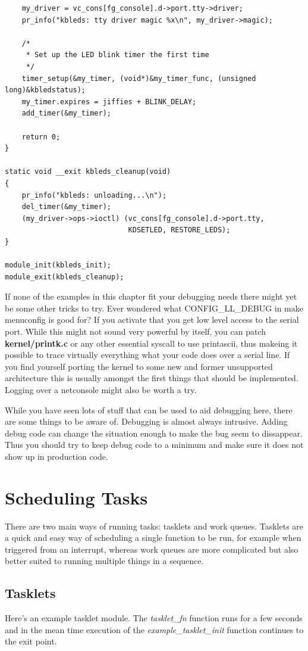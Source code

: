 \documentclass[11pt]{article}
\begin{document}
\begin{verbatim}
    my_driver = vc_cons[fg_console].d->port.tty->driver;
    pr_info("kbleds: tty driver magic %x\n", my_driver->magic);

    /*
     * Set up the LED blink timer the first time
     */
    timer_setup(&my_timer, (void*)&my_timer_func, (unsigned long)&kbledstatus);
    my_timer.expires = jiffies + BLINK_DELAY;
    add_timer(&my_timer);

    return 0;
}

static void __exit kbleds_cleanup(void)
{
    pr_info("kbleds: unloading...\n");
    del_timer(&my_timer);
    (my_driver->ops->ioctl) (vc_cons[fg_console].d->port.tty,
                             KDSETLED, RESTORE_LEDS);
}

module_init(kbleds_init);
module_exit(kbleds_cleanup);
\end{verbatim}

If none of the examples in this chapter fit your debugging needs there might yet be some other tricks to try. Ever wondered what CONFIG\_LL\_DEBUG in make menuconfig is good for? If you activate that you get low level access to the serial port. While this might not sound very powerful by itself, you can patch \textbf{kernel/printk.c} or any other essential syscall to use printascii, thus makeing it possible to trace virtually everything what your code does over a serial line. If you find yourself porting the kernel to some new and former unsupported architecture this is usually amongst the first things that should be implemented. Logging over a netconsole might also be worth a try.

While you have seen lots of stuff that can be used to aid debugging here, there are some things to be aware of. Debugging is almost always intrusive. Adding debug code can change the situation enough to make the bug seem to dissappear. Thus you should try to keep debug code to a minimum and make sure it does not show up in production code.

\section*{Scheduling Tasks}
\label{sec-14}
There are two main ways of running tasks: tasklets and work queues. Tasklets are a quick and easy way of scheduling a single function to be run, for example when triggered from an interrupt, whereas work queues are more complicated but also better suited to running multiple things in a sequence.

\subsection*{Tasklets}
\label{sec-14-1}
Here's an example tasklet module. The \emph{tasklet\_fn} function runs for a few seconds and in the mean time execution of the \emph{example\_tasklet\_init} function continues to the exit point.
\end{document}
